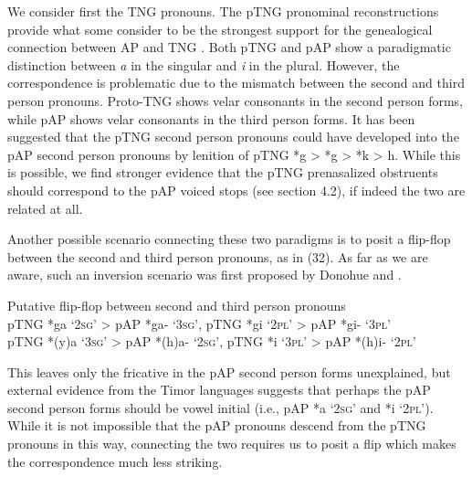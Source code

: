 We consider first the TNG pronouns. The pTNG pronominal reconstructions provide what some consider to be the strongest support for the genealogical connection between AP and TNG \citep{Ross2005}. Both pTNG and pAP show a paradigmatic distinction between \textit{a} in the singular and \textit{i} in the plural. However, the correspondence is problematic due to the mismatch between the second and third person pronouns. Proto-TNG shows velar consonants in the second person forms, while pAP shows velar consonants in the third person forms. It has been suggested that the pTNG second person pronouns could have developed into the pAP second person pronouns by lenition of pTNG *{\ng}g {\textgreater} *g {\textgreater} *k {\textgreater} h. While this is possible, we find stronger evidence that the pTNG prenasalized obstruents should correspond to the pAP voiced stops (see section 4.2), if indeed the two are related at all.

Another possible scenario connecting these two paradigms is to posit a flip-flop between the second and third person pronouns, as in (32). As far as we are aware, such an inversion scenario was first proposed by Donohue and \citet{Schapper2007}.

\ea%
   Putative flip-flop between second and third person pronouns  \\

pTNG *{\ng}ga `\textsc{2sg}' {\textgreater} pAP *ga- `\textsc{3sg}', pTNG *{\ng}gi `\textsc{2pl}' {\textgreater} pAP *gi- `\textsc{3pl}' \\
pTNG *(y)a `\textsc{3sg}' {\textgreater} pAP *(h)a- `\textsc{2sg}', pTNG *i `\textsc{3pl}' {\textgreater} pAP *(h)i- `\textsc{2pl}'
\z


This leaves only the fricative in the pAP second person forms unexplained, but external evidence from the Timor languages suggests that perhaps the pAP second person forms should be vowel initial (i.e., pAP *a `\textsc{2sg'} and *i `\textsc{2pl'}). While it is not impossible that the pAP pronouns descend from the pTNG pronouns in this way, connecting the two requires us to posit a flip which makes the correspondence much less striking.

